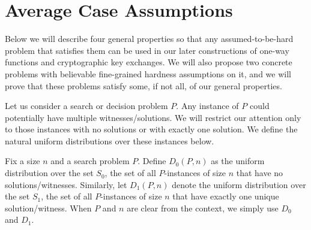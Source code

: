 \section{Average Case Assumptions}
\label{sec:averageCaseAssumptions}
Below we will describe four general properties so that any assumed-to-be-hard problem that satisfies them can be used in our later constructions of one-way functions and cryptographic key exchanges. We will also propose two concrete problems with believable fine-grained hardness assumptions on it, and we will prove that these problems satisfy some, if not all, of our general properties.

%

Let us consider a search or decision problem $P$. Any instance of $P$ could potentially have multiple witnesses/solutions. We will restrict our attention only to those instances with no solutions or with exactly one solution. We define the natural uniform distributions over these instances below.


%

\begin{definition} Fix a size $n$ and a search problem $P$.
	Define $D_0(P,n)$ as the uniform distribution over the set $S_0$, the set of all $P$-instances of size $n$ that have no solutions/witnesses.
	Similarly, let $D_1(P,n)$ denote the uniform distribution over the set $S_1$, the set of all $P$-instances of size $n$ that have exactly one unique solution/witness. When $P$ and $n$ are clear from the context, we simply use $D_0$ and $D_1$.
\end{definition}

%
%

